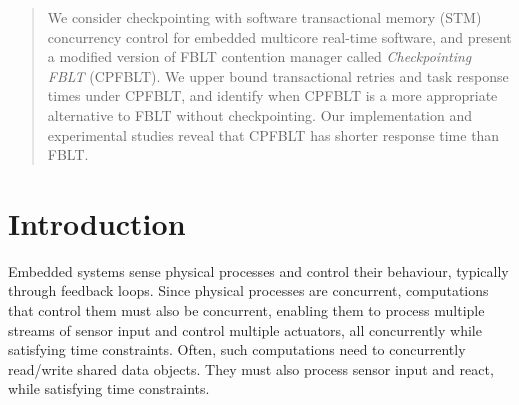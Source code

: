 \documentclass[conference]{IEEEtran}
\begin{document}
\begin{abstract}
We consider checkpointing with software transactional memory (STM) concurrency control for embedded multicore real-time software, and present a modified version of FBLT contention manager called \textit{Checkpointing FBLT} (CPFBLT). We upper bound transactional retries and task response times under CPFBLT, and identify when CPFBLT is a more appropriate alternative to FBLT without checkpointing. Our implementation and experimental studies reveal that CPFBLT has shorter response time than FBLT.
\end{abstract}





%
\IEEEpeerreviewmaketitle



\section{Introduction}
\label{sec:intro}

Embedded systems sense physical processes and control their behaviour, typically through feedback loops. Since physical processes are concurrent, computations that control them must also be concurrent, enabling them to process multiple streams of sensor input and control multiple actuators, all concurrently while satisfying time constraints. Often, such computations need to concurrently read/write shared data objects. They must also process sensor input and react, while satisfying time constraints. 
\end{document}
